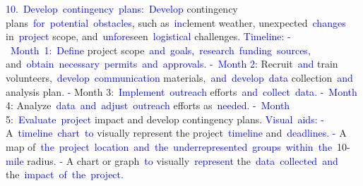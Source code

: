 \documentclass{article}
\begin{document}
\begin{tcolorbox}[colframe=black,colback=white]
{}\textcolor{blue}{10}\textcolor{blue}{.}\textcolor{blue}{~Develop}\textcolor{blue}{~contingency}\textcolor{blue}{~plans}\textcolor{blue}{:}\textcolor{blue}{~Develop} contingency plans\textcolor{blue}{~for}\textcolor{blue}{~potential}\textcolor{blue}{~obstacles}, such as\textcolor{blue}{~inc}lement weather\textcolor{blue}{,} unexpected\textcolor{blue}{~changes} in\textcolor{blue}{~project} scope\textcolor{blue}{,} and\textcolor{blue}{~unfore}seen\textcolor{blue}{~logistical} challenges\textcolor{blue}{.
}\textcolor{blue}{Timeline}\textcolor{blue}{:
}\textcolor{blue}{-}\textcolor{blue}{~Month}\textcolor{blue}{~}\textcolor{blue}{1}:\textcolor{blue}{~Define} project scope\textcolor{blue}{~and}\textcolor{blue}{~goals}\textcolor{blue}{,}\textcolor{blue}{~research}\textcolor{blue}{~funding}\textcolor{blue}{~sources}\textcolor{blue}{,} and\textcolor{blue}{~obtain}\textcolor{blue}{~necessary}\textcolor{blue}{~permits}\textcolor{blue}{~and}\textcolor{blue}{~approvals}\textcolor{blue}{.
}\textcolor{blue}{-}\textcolor{blue}{~Month} \textcolor{blue}{2}\textcolor{blue}{:} Recruit\textcolor{blue}{~and} train volunteers,\textcolor{blue}{~develop}\textcolor{blue}{~communication} materials\textcolor{blue}{,}\textcolor{blue}{~and}\textcolor{blue}{~develop}\textcolor{blue}{~data} collection\textcolor{blue}{~and} analysis plan\textcolor{blue}{.
}\textcolor{blue}{-} Month 3:\textcolor{blue}{~Implement}\textcolor{blue}{~outreach} efforts\textcolor{blue}{~and}\textcolor{blue}{~collect}\textcolor{blue}{~data}\textcolor{blue}{.
}\textcolor{blue}{-}\textcolor{blue}{~Month} 4: Analyze\textcolor{blue}{~data}\textcolor{blue}{~and}\textcolor{blue}{~adjust}\textcolor{blue}{~outreach} efforts as\textcolor{blue}{~needed}\textcolor{blue}{.
}\textcolor{blue}{-}\textcolor{blue}{~Month} 5:\textcolor{blue}{~Evaluate}\textcolor{blue}{~project} impact and develop contingency plans.
\textcolor{blue}{Visual}\textcolor{blue}{~aids}\textcolor{blue}{:
}\textcolor{blue}{-} A\textcolor{blue}{~timeline}\textcolor{blue}{~chart}\textcolor{blue}{~to} visually represent the project\textcolor{blue}{~timeline} and\textcolor{blue}{~deadlines}\textcolor{blue}{.
}\textcolor{blue}{-} A map of\textcolor{blue}{~the}\textcolor{blue}{~project}\textcolor{blue}{~location}\textcolor{blue}{~and}\textcolor{blue}{~the}\textcolor{blue}{~under}\textcolor{blue}{represented}\textcolor{blue}{~groups}\textcolor{blue}{~within}\textcolor{blue}{~the}\textcolor{blue}{~}10\textcolor{blue}{-mile} radius\textcolor{blue}{.
}\textcolor{blue}{-} A chart or graph\textcolor{blue}{~to} visually\textcolor{blue}{~represent} the\textcolor{blue}{~data}\textcolor{blue}{~collected}\textcolor{blue}{~and} the\textcolor{blue}{~impact}\textcolor{blue}{~of}\textcolor{blue}{~the}\textcolor{blue}{~project}\textcolor{blue}{.}\textcolor{blue}{}
\end{tcolorbox}
\end{document}
